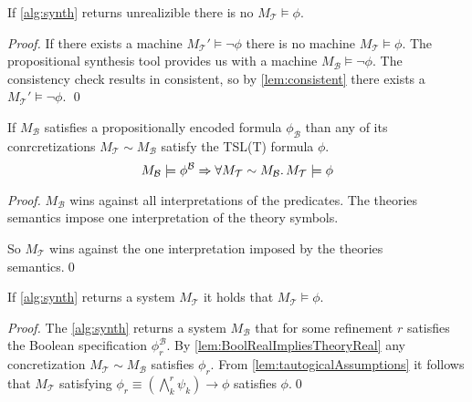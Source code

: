 \documentclass[runningheads]{llncs}
\newcommand{\theory}{\mathcal{T}}
\newcommand{\bool}{\mathcal{B}}
\begin{document}
\begin{theorem}
If \cref{alg:synth} returns unrealizible there is no $M_\theory \models \phi$.
\end{theorem}
\begin{proof}
If there exists a machine $M_\theory' \models \neg \phi$ there is no machine $M_\theory \models \phi$.
The propositional synthesis tool provides us with a machine $M_\bool \models \neg \phi$.
The consistency check results in consistent, so by \cref{lem:consistent} there exists a $M_\theory'\models \neg \phi$.
\qed
\end{proof}

\begin{lemma}
If $M_\bool$ satisfies a propositionally encoded formula $\phi_\bool$ than any of its conrcretizations $M_\theory \sim M_\bool$ satisfy the TSL(T) formula $\phi$.
$$M_\bool \models \phi^\bool \Rightarrow \forall M_\theory \sim M_\bool \ldotp M_\theory \models \phi$$
\label{lem:BoolRealImpliesTheoryReal}
\end{lemma}
\begin{proof}
$M_\bool$ wins against all interpretations of the predicates. 
The theories semantics impose one interpretation of the theory symbols.

So $M_\theory$ wins against the one interpretation imposed by the theories semantics.\qed
\end{proof}

\begin{theorem}
If \cref{alg:synth} returns a system $M_\theory$ it holds that $M_\theory \models \phi$.
\end{theorem}
\begin{proof}
The \cref{alg:synth} returns a system $M_\bool$ that for some refinement $r$ satisfies the Boolean specification $\phi_r^\bool$. 
By \cref{lem:BoolRealImpliesTheoryReal} any concretization $M_\theory \sim M_\bool$ satisfies $\phi_r$.
From \cref{lem:tautogicalAssumptions} it follows that $M_\theory$ satisfying $\phi_r \equiv (\bigwedge_k^r \psi_k) \rightarrow \phi$ satisfies $\phi$.\qed
\end{proof}




\end{document}
